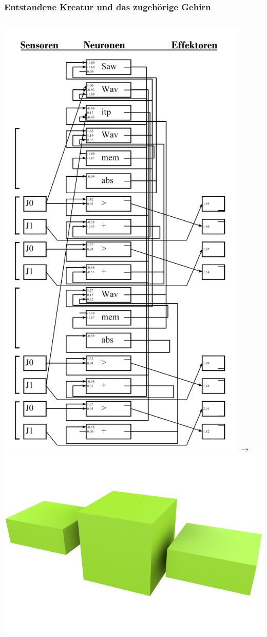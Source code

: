 \documentclass{beamer}
\begin{document}
\begin{frame}
	\frametitle{Entstandene Kreatur und das zugehörige Gehirn}
	\begin{columns}
		\centering
		\includegraphics[width=0.9\textwidth]{img/brain(1).png} \pause
		\centering
		$\longrightarrow$
		\centering
		\includegraphics[width=\textwidth]{img/1.png}
	\end{columns}
\end{frame}
\end{document}
